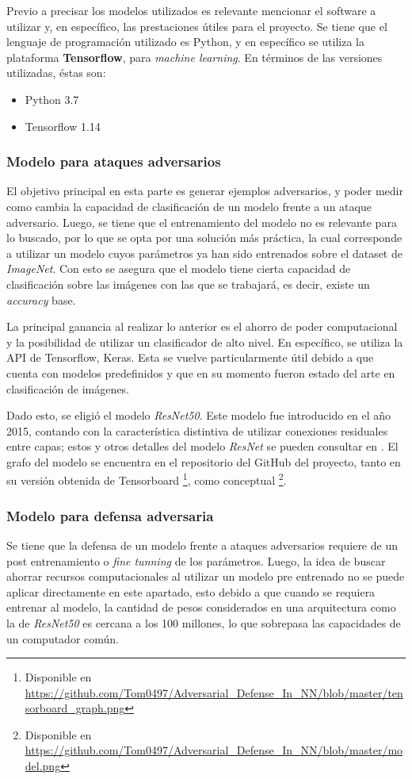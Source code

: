 \documentclass[conference]{IEEEtran}
\begin{document}
Previo a precisar los modelos utilizados es relevante mencionar el software a utilizar y, en específico, las prestaciones útiles para el proyecto. Se tiene que el lenguaje de programación utilizado es Python, y en específico se utiliza la plataforma \textbf{Tensorflow}, para \textit{machine learning}. En términos de las versiones utilizadas, éstas son:
\begin{itemize}
    \item Python 3.7
    \item Tensorflow 1.14
\end{itemize}

\subsubsection{Modelo para ataques adversarios}
El objetivo principal en esta parte es generar ejemplos adversarios, y poder medir como cambia la capacidad de clasificación de un modelo frente a un ataque adversario. Luego, se tiene que el entrenamiento del modelo no es relevante para lo buscado, por lo que se opta por una solución más práctica, la cual corresponde a utilizar un modelo cuyos parámetros ya han sido entrenados sobre el dataset de \textit{ImageNet}. Con esto se asegura que el modelo tiene cierta capacidad de clasificación sobre las imágenes con las que se trabajará, es decir, existe un \textit{accuracy} base.

La principal ganancia al realizar lo anterior es el ahorro de poder computacional y la posibilidad de utilizar un clasificador de alto nivel. En específico, se utiliza la API de Tensorflow, Keras. Esta se vuelve particularmente útil debido a que cuenta con modelos predefinidos y que en su momento fueron estado del arte en clasificación de imágenes.

Dado esto, se eligió el modelo \textit{ResNet50}. Este modelo fue introducido en el año 2015, contando con la característica distintiva de utilizar conexiones residuales entre capas; estos y otros detalles del modelo \textit{ResNet} se pueden consultar en \cite{resnet}. El grafo del modelo se encuentra en el repositorio del GitHub del proyecto, tanto en su versión obtenida de Tensorboard \footnote{Disponible en \url{https://github.com/Tom0497/Adversarial_Defense_In_NN/blob/master/tensorboard_graph.png}}, como conceptual \footnote{Disponible en \url{https://github.com/Tom0497/Adversarial_Defense_In_NN/blob/master/model.png}}.

\subsubsection{Modelo para defensa adversaria}
Se tiene que la defensa de un modelo frente a ataques adversarios requiere de un post entrenamiento o \textit{fine tunning} de los parámetros. Luego, la idea de buscar ahorrar recursos computacionales al utilizar un modelo pre entrenado no se puede aplicar directamente en este apartado, esto debido a que cuando se requiera entrenar al modelo, la cantidad de pesos considerados en una arquitectura como la de \textit{ResNet50} es cercana a los 100 millones, lo que sobrepasa las capacidades de un computador común.
\end{document}
